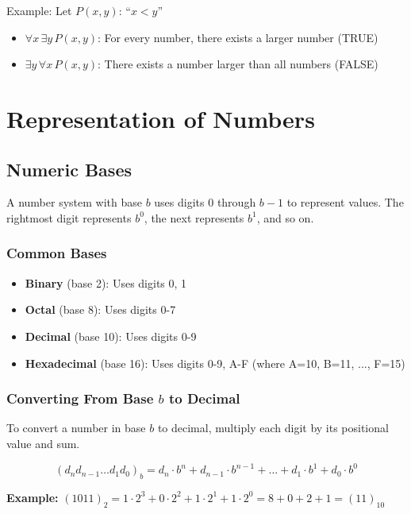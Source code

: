 \documentclass{report}
\begin{document}
Example: Let $P(x, y)$: ``$x < y$''
\begin{itemize}
    \item $\forall x \, \exists y \, P(x, y)$: For every number, there exists a larger number (TRUE)
    \item $\exists y \, \forall x \, P(x, y)$: There exists a number larger than all numbers (FALSE)
\end{itemize}

\chapter{Representation of Numbers}

\section{Numeric Bases}

A number system with base $b$ uses digits $0$ through $b-1$ to represent values. The rightmost digit represents $b^0$, the next represents $b^1$, and so on.

\subsection{Common Bases}

\begin{itemize}
    \item \textbf{Binary} (base 2): Uses digits 0, 1
    \item \textbf{Octal} (base 8): Uses digits 0-7
    \item \textbf{Decimal} (base 10): Uses digits 0-9
    \item \textbf{Hexadecimal} (base 16): Uses digits 0-9, A-F (where A=10, B=11, ..., F=15)
\end{itemize}

\subsection{Converting From Base $b$ to Decimal}

To convert a number in base $b$ to decimal, multiply each digit by its positional value and sum.

\begin{equation}
    (d_n d_{n-1} \ldots d_1 d_0)_b = d_n \cdot b^n + d_{n-1} \cdot b^{n-1} + \ldots + d_1 \cdot b^1 + d_0 \cdot b^0
\end{equation}

\textbf{Example:} $(1011)_2 = 1 \cdot 2^3 + 0 \cdot 2^2 + 1 \cdot 2^1 + 1 \cdot 2^0 = 8 + 0 + 2 + 1 = (11)_{10}$
\end{document}
